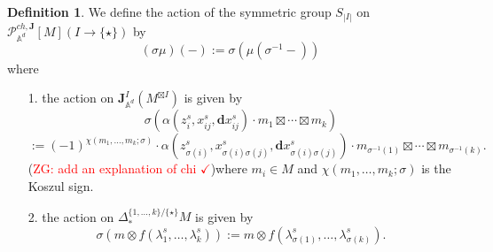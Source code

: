 \documentclass[11pt]{amsart}
\theoremstyle{definition}
\newtheorem{defn}[thm]{Definition}
\theoremstyle{remark}
\numberwithin{equation}{section}
\newcommand{\Gui}[1]{(\textcolor{red}{ZG: #1})}
\begin{document}
\begin{defn}\label{SymmetricGroupAction}
    We define the action of the symmetric group $S_{|I|}$ on $\mathcal{P}^{ch,\mathbf{J}}_{\mathbb{A}^d}[M](I\rightarrow \{\star\})$ by
$$
(\sigma\mu)(-):=\sigma\left(\mu(\sigma^{-1}-)\right)
$$
where
\begin{itemize}
  \item[1.] the action on $\mathbf{J}_{\mathbb{A}^d}^{I}(M^{\boxtimes I})$ is given by
    $$
    \sigma\left(\alpha(z^s_i,x^s_{ij},\mathbf{d}x^s_{ij})\cdot m_1\boxtimes\cdots\boxtimes m_k\right)
    $$
    $$
    :=(-1)^{\chi(m_1,\dots,m_k;\sigma)}\cdot\alpha(z^s_{\sigma(i)},x^s_{\sigma(i)\sigma(j)},\mathbf{d}x^s_{\sigma(i)\sigma(j)})\cdot m_{\sigma^{-1}(1)}\boxtimes\cdots\boxtimes m_{\sigma^{-1}(k)}.
    $$
    \Gui{add an explanation of chi $\checkmark$}where $m_i\in M$ and $\chi(m_1,\dots,m_k;\sigma)$ is the Koszul sign.
  \item[2.] the action on $\Delta_*^{\{1,\dots,k\}/\{\star\}}M$ is given by
    $$
    \sigma\left(m\otimes f(\lambda^s_1,\dots,\lambda^s_k)\right):=m\otimes f(\lambda^s_{\sigma(1)},\dots,\lambda^s_{\sigma(k)}).
    $$
\end{itemize}
\end{defn}
\end{document}

